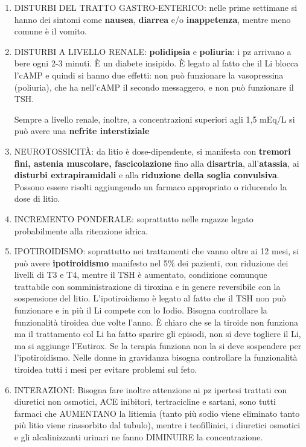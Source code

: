 \documentclass[]{article}
\begin{document}
\begin{enumerate}
\def\labelenumi{\arabic{enumi}.}
\item
  DISTURBI DEL TRATTO GASTRO-ENTERICO: nelle prime settimane si hanno
  dei sintomi come \textbf{nausea}, \textbf{diarrea} e/o
  \textbf{inappetenza}, mentre meno comune è il vomito.
\item
  DISTURBI A LIVELLO RENALE: \textbf{polidipsia} e \textbf{poliuria}: i
  pz arrivano a bere ogni 2-3 minuti. È un diabete insipido. È legato al
  fatto che il Li blocca l'cAMP e quindi si hanno due effetti: non può
  funzionare la vasopressina (poliuria), che ha nell'cAMP il secondo
  messaggero, e non può funzionare il TSH.

  Sempre a livello renale, inoltre, a concentrazioni superiori agli 1,5
  mEq/L si può avere una \textbf{nefrite interstiziale}
\item
  NEUROTOSSICITÀ: da litio è dose-dipendente, si manifesta con
  \textbf{tremori fini, astenia muscolare, fascicolazione} fino alla
  \textbf{disartria}, all'\textbf{atassia}, ai \textbf{disturbi
  extrapiramidali} e alla \textbf{riduzione della soglia}
  \textbf{convulsiva}. Possono essere risolti aggiungendo un farmaco
  appropriato o riducendo la dose di litio.
\item
  INCREMENTO PONDERALE: soprattutto nelle ragazze legato probabilmente
  alla ritenzione idrica.
\item
  IPOTIROIDISMO: soprattutto nei trattamenti che vanno oltre ai 12 mesi,
  si può avere \textbf{ipotiroidismo} manifesto nel 5\% dei pazienti,
  con riduzione dei livelli di T3 e T4, mentre il TSH è aumentato,
  condizione comunque trattabile con somministrazione di tiroxina e in
  genere reversibile con la sospensione del litio. L'ipotiroidismo è
  legato al fatto che il TSH non può funzionare e in più il Li compete
  con lo Iodio. Bisogna controllare la funzionalità tiroidea due volte
  l'anno. È chiaro che se la tiroide non funziona ma il trattamento col
  Li ha fatto sparire gli episodi, non si deve togliere il Li, ma si
  aggiunge l'Eutirox. Se la terapia funziona non la si deve sospendere
  per l'ipotiroidismo. Nelle donne in gravidanza bisogna controllare la
  funzionalità tiroidea tutti i mesi per evitare problemi sul feto.
\item
  INTERAZIONI: Bisogna fare inoltre attenzione ai pz ipertesi trattati
  con diuretici non osmotici, ACE inibitori, tertracicline e sartani,
  sono tutti farmaci che AUMENTANO la litiemia (tanto più sodio viene
  eliminato tanto più litio viene riassorbito dal tubulo), mentre i
  teofillinici, i diuretici osmotici e gli alcalinizzanti urinari ne
  fanno DIMINUIRE la concentrazione.


\end{enumerate}
\end{document}
